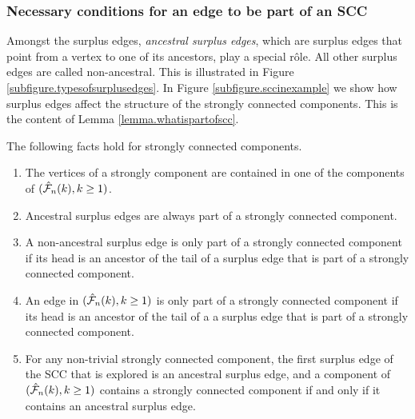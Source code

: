 \subsubsection{Necessary conditions for an edge to be part of an SCC}\label{subsubsec.defcandidates}
Amongst the surplus edges, \emph{ancestral surplus edges}, which are surplus edges that point from a vertex to one of its ancestors, play a special rôle. All other surplus edges are called non-ancestral.  This is illustrated in Figure \ref{subfigure.typesofsurplusedges}. In Figure \ref{subfigure.sccinexample} we show how surplus edges affect the structure of the strongly connected components. This is the content of Lemma \ref{lemma.whatispartofscc}.
\begin{lemma}\label{lemma.whatispartofscc}
The following facts hold for strongly connected components. 
\begin{enumerate}
\item \label{item.factsonsccs1}The vertices of a strongly component are contained in one of the components of $(\hat{{\mathcal F}}_n(k),k\geq 1)$. 
\item \label{item.factsonsccs2} Ancestral surplus edges are always part of a strongly connected component.
\item \label{item.factsonsccs4} A non-ancestral surplus edge is only part of a strongly connected component if its head is an ancestor of the tail of a surplus edge that is part of a strongly connected component.
\item \label{item.factsonsccs4andabit} An edge in $(\hat{{\mathcal F}}_n(k),k\geq 1)$ is only part of a strongly connected component if its head is an ancestor of the tail of a a surplus edge that is part of a strongly connected component.
\item \label{item.factsonsccs5} For any non-trivial strongly connected component, the first surplus edge of the SCC that is explored is an ancestral surplus edge, and a component of  $(\hat{{\mathcal F}}_n(k),k\geq 1)$ contains a strongly connected component if and only if it contains an ancestral surplus edge.
\end{enumerate}
\end{lemma}
